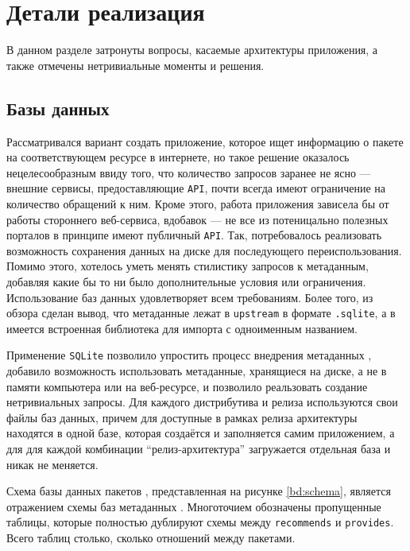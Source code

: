 
\section{Детали реализация}
В данном разделе затронуты вопросы, касаемые архитектуры приложения, а также отмечены нетривиальные моменты и решения.

\subsection{Базы данных}
Рассматривался вариант создать приложение, которое ищет информацию о пакете на соответствующем ресурсе в интернете, но такое решение оказалось нецелесообразным ввиду того, что количество запросов заранее не ясно --- внешние сервисы, предоставляющие \texttt{API}, почти всегда имеют ограничение на количество обращений к ним. Кроме этого, работа приложения зависела бы от работы стороннего веб-сервиса, вдобавок --- не все из потеницально полезных порталов в принципе имеют публичный \texttt{API}. Так, потребовалось реализовать возможность сохранения данных на диске для последующего переиспользования.
Помимо этого, хотелось уметь менять стилистику запросов к метаданным, добавляя какие бы то ни было дополнительные условия или ограничения. Использование баз данных удовлетворяет всем требованиям. Более того, из обзора сделан вывод, что метаданные {\fedora} лежат в \texttt{upstream} в формате \texttt{.sqlite}, а в {\python} имеется встроенная библиотека для импорта с одноименным названием.

Применение \texttt{SQLite} позволило упростить процесс внедрения метаданных {\fedora}, добавило возможность использовать метаданные, хранящиеся на диске, а не в памяти компьютера или на веб-ресурсе, и позволило реальзовать создание нетривиальных запросы.
Для каждого дистрибутива и релиза используются свои файлы баз данных, причем для {\ubuntu} доступные в рамках релиза архитектуры находятся в одной базе, которая создаётся и заполняется самим приложением, а для {\fedora} для каждой комбинации \enquote{релиз-архитектура} загружается отдельная база и никак не меняется.

Схема базы данных пакетов {\ubuntu}, представленная на рисунке \ref{bd:schema}, является отражением схемы баз метаданных {\fedora}.
Многоточием обозначены пропущенные таблицы, которые полностью дублируют схемы между \texttt{recommends} и \texttt{provides}.
Всего таблиц столько, сколько отношений между пакетами.

